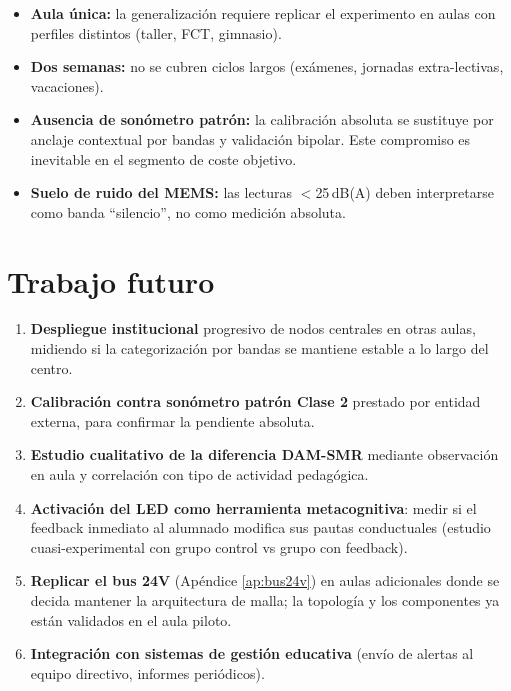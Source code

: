 \documentclass[11pt,a4paper,openany]{report}
\begin{document}
\begin{itemize}
    \item \textbf{Aula \'unica:} la generalizaci\'on requiere replicar el experimento en aulas con perfiles distintos (taller, FCT, gimnasio).
    \item \textbf{Dos semanas:} no se cubren ciclos largos (ex\'amenes, jornadas extra-lectivas, vacaciones).
    \item \textbf{Ausencia de son\'ometro patr\'on:} la calibraci\'on absoluta se sustituye por anclaje contextual por bandas y validaci\'on bipolar. Este compromiso es inevitable en el segmento de coste objetivo.
    \item \textbf{Suelo de ruido del MEMS:} las lecturas $<$25\,dB(A) deben interpretarse como banda ``silencio'', no como medici\'on absoluta.
\end{itemize}

\section{Trabajo futuro}

\begin{enumerate}
    \item \textbf{Despliegue institucional} progresivo de nodos centrales en otras aulas, midiendo si la categorizaci\'on por bandas se mantiene estable a lo largo del centro.
    \item \textbf{Calibraci\'on contra son\'ometro patr\'on Clase 2} prestado por entidad externa, para confirmar la pendiente absoluta.
    \item \textbf{Estudio cualitativo de la diferencia DAM-SMR} mediante observaci\'on en aula y correlaci\'on con tipo de actividad pedag\'ogica.
    \item \textbf{Activaci\'on del LED como herramienta metacognitiva}: medir si el feedback inmediato al alumnado modifica sus pautas conductuales (estudio cuasi-experimental con grupo control vs grupo con feedback).
    \item \textbf{Replicar el bus 24V} (Ap\'endice \ref{ap:bus24v}) en aulas adicionales donde se decida mantener la arquitectura de malla; la topolog\'ia y los componentes ya est\'an validados en el aula piloto.
    \item \textbf{Integraci\'on con sistemas de gesti\'on educativa} (env\'io de alertas al equipo directivo, informes peri\'odicos).
\end{enumerate}

\end{document}
